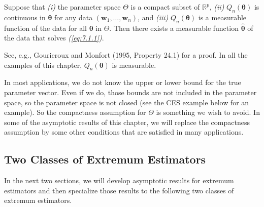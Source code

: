 \begin{lemma}
\label{lem:7.1}
Suppose that \emph{(i)} the parameter space $\Theta$ is a compact subset of $\mathbb{R}^p$, \emph{(ii)} $Q_n(\bm{\theta})$ is continuous in $\bm{\theta}$ for any data $(\mathbf{w}_1, \ldots, \mathbf{w}_n)$, and \emph{(iii)} $Q_n(\bm{\theta})$ is a measurable function of the data for all $\bm{\theta}$ in $\Theta$. Then there exists a measurable function $\hat{\bm{\theta}}$ of the data that solves \emph{(\ref{eq:7.1.1})}.
\end{lemma}

See, e.g., Gourieroux and Monfort (1995, Property 24.1) for a proof. In all the examples of this chapter, $Q_n(\bm{\theta})$ is measurable.

In most applications, we do not know the upper or lower bound for the true parameter vector. Even if we do, those bounds are not included in the parameter space, so the parameter space is not closed (see the CES example below for an example). So the compactness assumption for $\Theta$ is something we wish to avoid. In some of the asymptotic results of this chapter, we will replace the compactness assumption by some other conditions that are satisfied in many applications.

\subsection*{Two Classes of Extremum Estimators}

In the next two sections, we will develop asymptotic results for extremum estimators and then specialize those results to the following two classes of extremum estimators.

